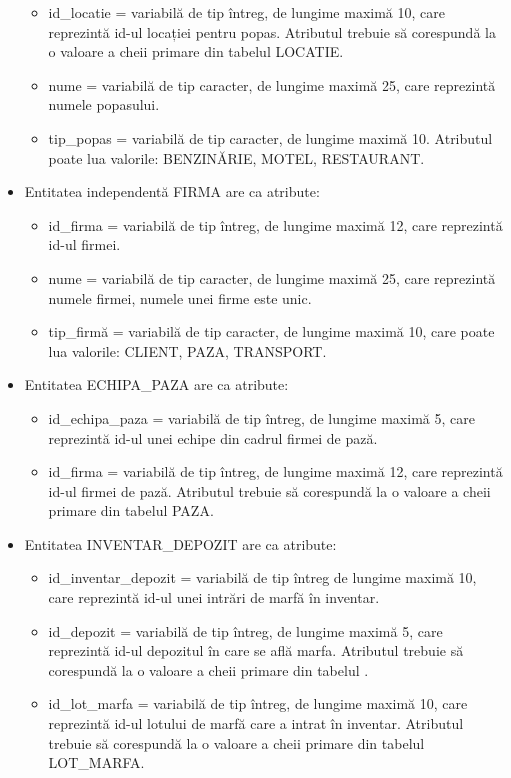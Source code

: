 \documentclass[12pt, a4paper]{article}
\begin{document}
\begin{itemize}
\begin{itemize}
            \item id\_locatie = variabilă de tip întreg, de lungime maximă 10, care reprezintă id-ul locației pentru popas. Atributul trebuie să corespundă la o valoare a cheii primare din tabelul LOCATIE.
            \item nume = variabilă de tip caracter, de lungime maximă 25, care reprezintă numele popasului.
            \item tip\_popas = variabilă de tip caracter, de lungime maximă 10. Atributul poate lua valorile: BENZINĂRIE, MOTEL, RESTAURANT.
        \end{itemize}
    \item Entitatea independentă FIRMA are ca atribute:
        \begin{itemize}
            \item id\_firma = variabilă de tip întreg, de lungime maximă 12, care reprezintă id-ul firmei.
            \item nume = variabilă de tip caracter, de lungime maximă 25, care reprezintă numele firmei, numele unei firme este unic.
            \item tip\_firmă = variabilă de tip caracter, de lungime maximă 10, care poate lua valorile: CLIENT, PAZA, TRANSPORT.
        \end{itemize}
    \item Entitatea ECHIPA\_PAZA are ca atribute:
        \begin{itemize}
            \item id\_echipa\_paza = variabilă de tip întreg, de lungime maximă 5, care reprezintă id-ul unei echipe din cadrul firmei de pază.
            \item id\_firma = variabilă de tip întreg, de lungime maximă 12, care reprezintă id-ul firmei de pază. Atributul trebuie să corespundă la o valoare a cheii primare din tabelul PAZA.
        \end{itemize}
    \item Entitatea INVENTAR\_DEPOZIT are ca atribute:
        \begin{itemize}
            \item id\_inventar\_depozit = variabilă de tip întreg de lungime maximă 10, care reprezintă id-ul unei intrări de marfă în inventar.
            \item id\_depozit = variabilă de tip întreg, de lungime maximă 5, care reprezintă id-ul depozitul în care se află marfa. Atributul trebuie să corespundă la o valoare a cheii primare din tabelul .
            \item id\_lot\_marfa = variabilă de tip întreg, de lungime maximă 10, care reprezintă id-ul lotului de marfă care a intrat în inventar. Atributul trebuie să corespundă la o valoare a cheii primare din tabelul LOT\_MARFA.

\end{itemize}
\end{itemize}
\end{document}
